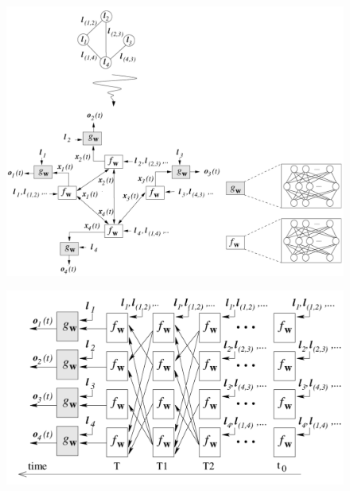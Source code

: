 \documentclass[10pt,aspectratio=169]{beamer}
\begin{document}
\begin{frame}[allowframebreaks]
    \begin{figure}
        \centering
        \includegraphics[width=.65\textwidth]{pic/network1.png}
    \end{figure}
    
    \begin{figure}
        \centering
        \includegraphics[width=.65\textwidth]{pic/network2.png}
    \end{figure}
           
\end{frame}
\end{document}
